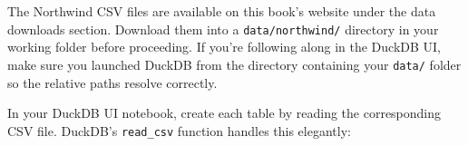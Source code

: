 \documentclass[
  letterpaper,
  DIV=11,
  numbers=noendperiod]{scrreprt}
\begin{document}
\begin{tcolorbox}[enhanced jigsaw, opacitybacktitle=0.6, arc=.35mm, colback=white, bottomtitle=1mm, opacityback=0, toprule=.15mm, left=2mm, colbacktitle=quarto-callout-note-color!10!white, breakable, coltitle=black, toptitle=1mm, colframe=quarto-callout-note-color-frame, bottomrule=.15mm, titlerule=0mm, title=\textcolor{quarto-callout-note-color}{\faInfo}\hspace{0.5em}{Downloading the Data}, rightrule=.15mm, leftrule=.75mm]

The Northwind CSV files are available on this book's website under the
data downloads section. Download them into a \texttt{data/northwind/}
directory in your working folder before proceeding. If you're following
along in the DuckDB UI, make sure you launched DuckDB from the directory
containing your \texttt{data/} folder so the relative paths resolve
correctly.

\end{tcolorbox}

In your DuckDB UI notebook, create each table by reading the
corresponding CSV file. DuckDB's \texttt{read\_csv} function handles
this elegantly:
\end{document}
